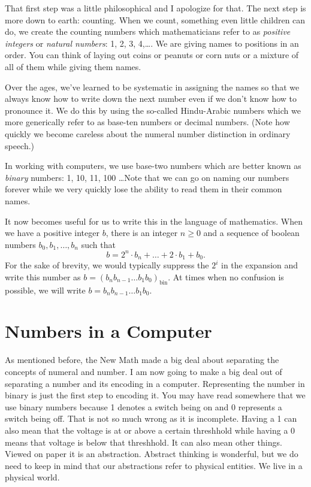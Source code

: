 That first step was a little philosophical and I apologize for that.  The next step is more down to earth: counting.  When we count, something even little children can do, we create the counting numbers which mathematicians refer to as \emph{positive integers} or \emph{natural numbers}:   1, 2, 3, 4,\dots. We are giving names to positions in an order. You can think of laying out coins or peanuts or corn nuts or a mixture of all of them while giving them names.

Over the ages, we've learned to be systematic in assigning the names so that we always know how to write down the next number even if we don't know how to pronounce it.  We do this by using the so-called Hindu-Arabic numbers which we more generically refer to as base-ten numbers or decimal numbers. (Note how quickly we become careless about the numeral number distinction in ordinary speech.)

In working with computers, we use base-two numbers which are better known as \emph{binary} numbers:  1, 10, 11, 100 \dots Note that we can go on naming our numbers forever while we very quickly lose the ability to read them in their common names.

It now becomes useful for us to write this in the language of mathematics.  When we have a positive integer $b$, there is an integer $n\ge 0$ and a sequence of boolean numbers $b_0, b_1, \dots, b_n$ such that
\[
b = 2^n\cdot b_n + \dots + 2 \cdot b_1 + b_0.
\]
For the sake of brevity, we would typically suppress the $2^i$ in the expansion and write this number as $b=(b_nb_{n-1}\dots b_1b_0)_\text{bin}$. At times when no confusion is possible, we will write $b=b_nb_{n-1}\dots b_1b_0$.

\section{Numbers in a Computer}
As mentioned before, the New Math made a big deal about separating the concepts of numeral and number.  I am now going to make a big deal out of separating a number and its encoding in a computer. Representing the number in binary is just the first step to encoding it.  You may have read somewhere that we use binary numbers because 1 denotes a switch being on and 0 represents a switch being off.  That is not so much wrong as it is incomplete.  Having a 1 can also mean that the voltage is at or above a certain threshhold while having a 0 means that voltage is below that threshhold.  It can also mean other things.  Viewed on paper it is an abstraction.  Abstract thinking is wonderful, but we do need to keep in mind that our abstractions refer to physical entities.  We live in a physical world.

